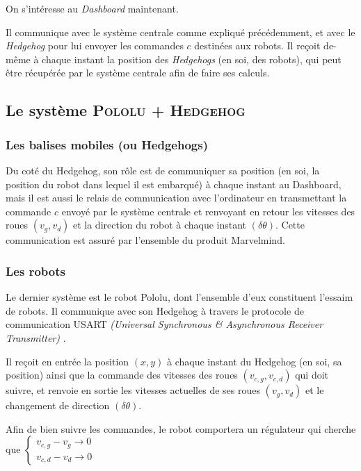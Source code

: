 On s'intéresse au \textit{Dashboard} maintenant. 

Il communique avec le système centrale comme expliqué précédemment, et avec le \textit{Hedgehog} pour lui envoyer les commandes $c$ destinées aux robots. Il reçoit de-même à chaque instant la position des \textit{Hedgehogs} (en soi, des robots), qui peut être récupérée par le système centrale afin de faire ses calculs.

\subsection{Le système \textsc{Pololu + Hedgehog}}

\subsubsection{Les balises mobiles (ou Hedgehogs)}
Du coté du Hedgehog, son rôle est de communiquer sa position (en soi, la position du robot dans lequel il est embarqué) à chaque instant au Dashboard, mais il est aussi le relais de communication avec l'ordinateur en transmettant la commande $c$ envoyé par le système centrale et renvoyant en retour les vitesses des roues $(v_g, v_d)$ et la direction du robot à chaque instant $(\delta \theta)$. Cette communication est assuré par l'ensemble du produit Marvelmind. 

\subsubsection{Les robots}
Le dernier système est le robot Pololu, dont l'ensemble d'eux constituent l'essaim de robots. Il communique avec son Hedgehog à travers le protocole de communication USART \textit{(Universal Synchronous \& Asynchronous Receiver Transmitter)} \cite{UART-wikipedia-url}.

\noindent Il reçoit en entrée la position $(x,y)$ à chaque instant du Hedgehog (en soi, sa position) ainsi que la commande des vitesses des roues $(v_{c,g}, v_{c,d})$ qui doit suivre, et renvoie en sortie les vitesses actuelles de ses roues $(v_g, v_d)$ et le changement de direction $(\delta\theta)$.

\noindent Afin de bien suivre les commandes, le robot comportera un régulateur qui cherche que $\left \{ \begin{array}{ll}
     v_{c,g} - v_g \rightarrow 0  \\
     v_{c,d} - v_d \rightarrow 0
\end{array} \right .$

